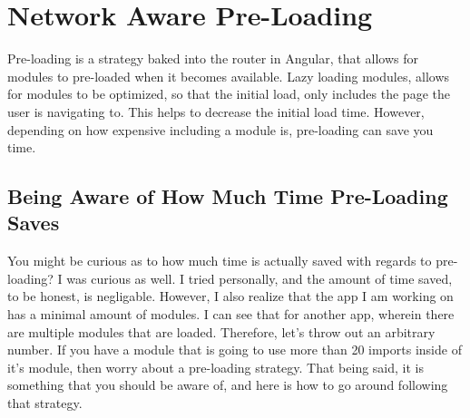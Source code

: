\chapter{ Network Aware Pre-Loading }

Pre-loading is a strategy baked into the router in Angular, that allows for
modules to pre-loaded when it becomes available. Lazy loading modules, allows 
for modules to be optimized, so that the initial load, only includes the page 
the user is navigating to. This helps to decrease the initial load time. 
However, depending on how expensive including a module is, pre-loading can
save you time. 

\section{ Being Aware of How Much Time Pre-Loading Saves }
You might be curious as to how much time is actually saved with regards to 
pre-loading? I was curious as well. I tried personally, and the amount of 
time saved, to be honest, is negligable. However, I also realize that the 
app I am working on has a minimal amount of modules. I can see that for 
another app, wherein there are multiple modules that are loaded. Therefore, 
let's throw out an arbitrary number. If you have a module that is going to 
use more than 20 imports inside of it's module, then worry about a pre-loading 
strategy. That being said, it is something that you should be aware of, and
here is how to go around following that strategy. 
